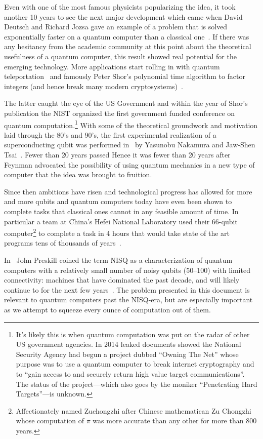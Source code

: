 Even with one of the most famous physicists popularizing the idea, it took another 10 years to see the next major development which came when David Deutsch and Richard Jozsa gave an example of a problem that is solved exponentially faster on a quantum computer than a classical one~\cite{deutch-jozsa-algo}.
If there was any hesitancy from the academic community at this point about the theoretical usefulness of a quantum computer, this result showed real potential for the emerging technology.
More applications start rolling in with quantum teleportation~\cite{quantumteleportation} and famously Peter Shor's polynomial time algorithm to factor integers (and hence break many modern cryptosystems)~\cite{shor-encryption}.

The latter caught the eye of the US Government and within the year of Shor's publication the \ac{NIST} organized the first government funded conference on quantum computation.\footnote{It's likely this is when quantum computation was put on the radar of other US government agencies. In 2014 leaked documents showed the National Security Agency had begun a project dubbed ``Owning The Net'' whose purpose was to use a quantum computer to break internet cryptography and to ``gain access to and securely return high value target communications''. The status of the project---which also goes by the moniker ``Penetrating Hard Targets''---is unknown.}
With some of the theoretical groundwork and motivation laid through the 80's and 90's, the first experimental realization of a superconducting qubit was performed in~\citeyear{firstqubit} by Yasunobu Nakamura and Jaw-Shen Tsai~\cite{firstqubit}.
Fewer than 20 years passed
Hence it was fewer than 20 years after Feynman advocated the possibility of using quantum mechanics in a new type of computer that the idea was brought to fruition.

Since then ambitions have risen and technological progress has allowed for more and more qubits and quantum computers today have even been shown to complete tasks that classical ones cannot in any feasible amount of time.
In particular a team at China's Hefei National Laboratory used their 66-qubit computer\footnote{Affectionately named Zuchongzhi after Chinese mathematican Zu Chongzhi whose computation of $\pi$ was more accurate than any other for more than 800 years.} to complete a task in 4 hours that would take state of the art programs tens of thousands of years~\cite{zuchongzhi}.

In~\citeyear{nisq} John Preskill coined the term \ac{NISQ} as a characterization of quantum computers with a relatively small number of noisy qubits (50--100) with limited connectivity: \ie{} machines that have dominated the past decade, and will likely continue to for the next few years~\cite{nisq}.
The problem presented in this document is relevant to quantum computers past the \ac{NISQ}-era, but are especially important as we attempt to squeeze every ounce of computation out of them.


